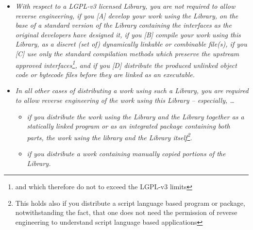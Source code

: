 \begin{itemize}  
  \item \emph{With respect to a LGPL-v3 licensed Library, you are not required
  to allow reverse engineering, if you [A] develop your work using the Library,
  on the base of a standard version of the Library containing the interfaces as
  the original developers have designed it, if you [B] compile your work using
  this Library, as a discret (set of) dynamically linkable or combinable
  file(s), if you [C] use only the standard compilation methods which preserve
  the upstream approved interfaces\footnote{and which therefore do not to exceed
  the LGPL-v3 limits}, and if you [D] distribute the produced unlinked object
  code or bytecode files before they are linked as an executable.}
  \item \emph{In all other cases of distributing a work using such a Library,
  you are required to allow reverse engineering of the work using this Library
  -- especially, \ldots}
  \begin{itemize}
    \item \emph{if you distribute the work using the Library and the Library
    together as a statically linked program or as an integrated package
    containing both parts, the work using the library and the Library
    itself\footnote{This holds also if you distribute a script language based
    program or package, notwithstanding the fact, that one does not need the
    permission of reverse engineering to understand script language based
    applications}.}
    \item \emph{if you distribute a work containing manually copied portions of
    the Library.}
  \end{itemize}
\end{itemize}



